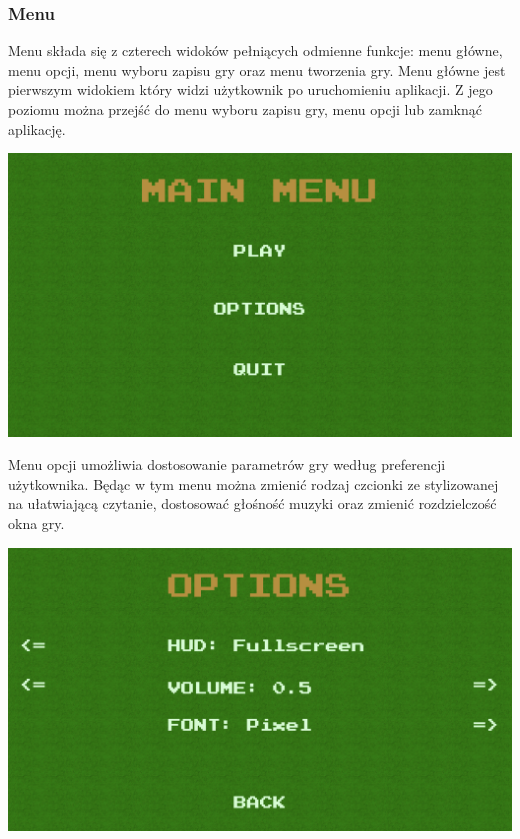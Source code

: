 \documentclass{article}
\begin{document}
\subsubsection{Menu}
Menu składa się z czterech widoków pełniących odmienne funkcje: menu główne, menu opcji, menu wyboru zapisu gry oraz menu tworzenia gry. Menu główne jest pierwszym widokiem który widzi użytkownik po uruchomieniu aplikacji. Z jego poziomu można przejść do menu wyboru zapisu gry, menu opcji lub zamknąć aplikację.
\begin{center}
     \includegraphics[width=\textwidth]{mainMenu.png}
\end{center}
Menu opcji umożliwia dostosowanie parametrów gry według preferencji użytkownika. Będąc w tym menu można zmienić rodzaj czcionki ze stylizowanej na ułatwiającą czytanie, dostosować głośność muzyki oraz zmienić rozdzielczość okna gry.
\begin{center}
     \includegraphics[width=\textwidth]{optionsMenu.png}
\end{center}
\end{document}
